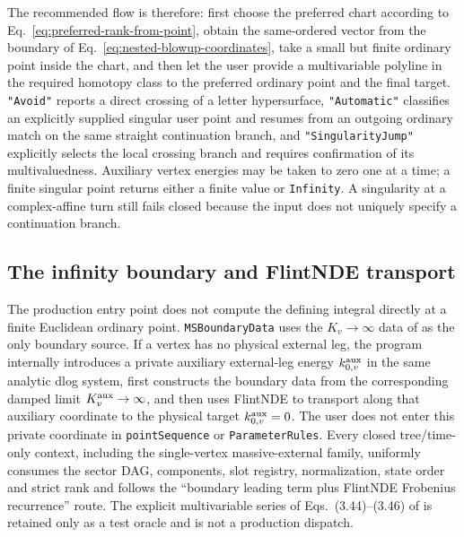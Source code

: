 \documentclass[11pt,a4paper]{article}
\begin{document}
The recommended flow is therefore: first choose the preferred chart according to Eq.~\eqref{eq:preferred-rank-from-point}, obtain the same-ordered vector from the boundary of Eq.~\eqref{eq:nested-blowup-coordinates}, take a small but finite ordinary point inside the chart, and then let the user provide a multivariable polyline in the required homotopy class to the preferred ordinary point and the final target.  \texttt{"Avoid"} reports a direct crossing of a letter hypersurface, \texttt{"Automatic"} classifies an explicitly supplied singular user point and resumes from an outgoing ordinary match on the same straight continuation branch, and \texttt{"SingularityJump"} explicitly selects the local crossing branch and requires confirmation of its multivaluedness.  Auxiliary vertex energies may be taken to zero one at a time; a finite singular point returns either a finite value or \texttt{Infinity}.  A singularity at a complex-affine turn still fails closed because the input does not uniquely specify a continuation branch.

\subsection{The \texorpdfstring{\cite{Chen:2024jms}}{arXiv:2411.03088} infinity boundary and FlintNDE transport}
\label{sec:infinity-boundary-transport}

The production entry point does not compute the defining integral directly at a finite Euclidean ordinary point. \texttt{MSBoundaryData} uses the $K_v\to\infty$ data of \cite{Chen:2024jms} as the only boundary source. If a vertex has no physical external leg, the program internally introduces a private auxiliary external-leg energy $k_{0,v}^{\rm aux}$ in the same analytic dlog system, first constructs the boundary data from the corresponding damped limit $K_v^{\rm aux}\to\infty$, and then uses FlintNDE to transport along that auxiliary coordinate to the physical target $k_{0,v}^{\rm aux}=0$. The user does not enter this private coordinate in \texttt{pointSequence} or \texttt{ParameterRules}. Every closed tree/time-only context, including the single-vertex massive-external family, uniformly consumes the sector DAG, components, slot registry, normalization, state order and strict rank and follows the ``boundary leading term plus FlintNDE Frobenius recurrence'' route. The explicit multivariable series of Eqs.~(3.44)--(3.46) of \cite{Chen:2024jms} is retained only as a test oracle and is not a production dispatch.
\end{document}
